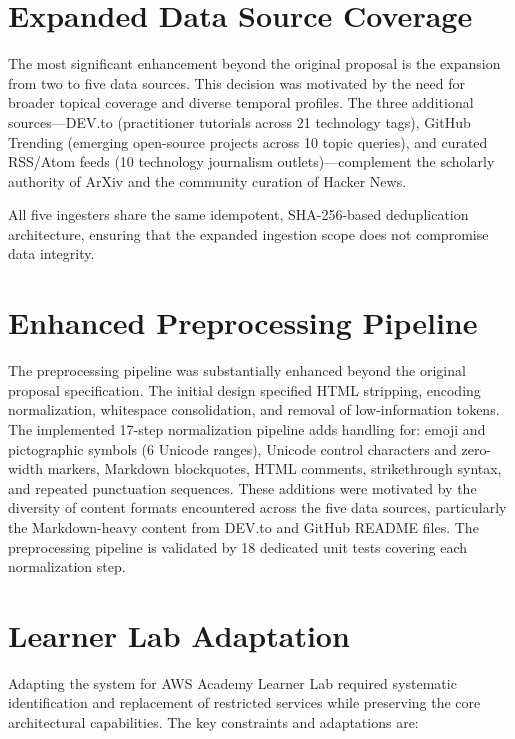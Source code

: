 \documentclass[12pt,a4paper]{report}
\begin{document}
\section{Expanded Data Source Coverage}
\label{sec:expanded_sources}

The most significant enhancement beyond the original proposal is the expansion from two to five data sources. This decision was motivated by the need for broader topical coverage and diverse temporal profiles. The three additional sources---DEV.to (practitioner tutorials across 21 technology tags), GitHub Trending (emerging open-source projects across 10 topic queries), and curated RSS/Atom feeds (10 technology journalism outlets)---complement the scholarly authority of ArXiv and the community curation of Hacker News.

All five ingesters share the same idempotent, SHA-256-based deduplication architecture, ensuring that the expanded ingestion scope does not compromise data integrity.

\section{Enhanced Preprocessing Pipeline}
\label{sec:enhanced_preprocessing}

The preprocessing pipeline was substantially enhanced beyond the original proposal specification. The initial design specified HTML stripping, encoding normalization, whitespace consolidation, and removal of low-information tokens. The implemented 17-step normalization pipeline adds handling for: emoji and pictographic symbols (6 Unicode ranges), Unicode control characters and zero-width markers, Markdown blockquotes, HTML comments, strikethrough syntax, and repeated punctuation sequences. These additions were motivated by the diversity of content formats encountered across the five data sources, particularly the Markdown-heavy content from DEV.to and GitHub README files. The preprocessing pipeline is validated by 18 dedicated unit tests covering each normalization step.

\section{Learner Lab Adaptation}
\label{sec:learnerlab}

Adapting the system for AWS Academy Learner Lab required systematic identification and replacement of restricted services while preserving the core architectural capabilities. The key constraints and adaptations are:
\end{document}
